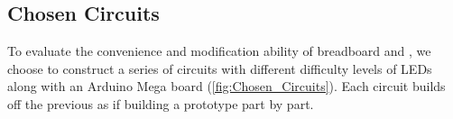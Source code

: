 


\subsection{Chosen Circuits}

To evaluate the convenience and modification ability of breadboard and \papertitle, we choose to construct a series of circuits with different difficulty levels of LEDs along with an Arduino Mega board (\autoref{fig:Chosen_Circuits}). Each circuit builds off the previous as if building a prototype part by part.

